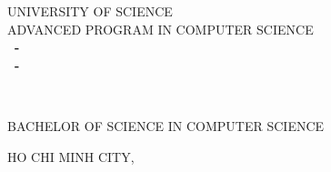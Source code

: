 \begin{titlepage}

\begin{center}
UNIVERSITY OF SCIENCE\\
ADVANCED PROGRAM IN COMPUTER SCIENCE\\[2cm]

{ \Large \bfseries \MakeUppercase{\tenSV ~-~ \mssv} \\[2cm]
\Large \bfseries \MakeUppercase{\tenSVt ~-~ \mssvt} } %

{ \LARGE \bfseries \MakeUppercase{\tenKL} \\[2cm] } %

\Large BACHELOR OF SCIENCE IN COMPUTER SCIENCE\\[2cm]



\vfill
HO CHI MINH CITY, \the\year

\end{center}

\end{titlepage}

